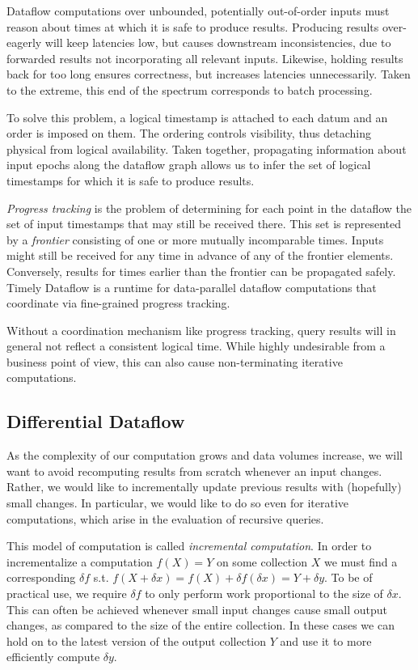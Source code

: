 \documentclass[../index.tex]{subfiles}
\begin{document}
Dataflow computations over unbounded, potentially out-of-order inputs
must reason about times at which it is safe to produce
results. Producing results over-eagerly will keep latencies low, but
causes downstream inconsistencies, due to forwarded results not
incorporating all relevant inputs. Likewise, holding results back for
too long ensures correctness, but increases latencies
unnecessarily. Taken to the extreme, this end of the spectrum
corresponds to batch processing.

To solve this problem, a logical timestamp is attached to each datum
and an order is imposed on them. The ordering controls visibility,
thus detaching physical from logical availability. Taken together,
propagating information about input epochs along the dataflow graph
allows us to infer the set of logical timestamps for which it is safe
to produce results.

\emph{Progress tracking} is the problem of determining for each point
in the dataflow the set of input timestamps that may still be received
there. This set is represented by a \emph{frontier} consisting of one
or more mutually incomparable times. Inputs might still be received
for any time in advance of any of the frontier elements. Conversely,
results for times earlier than the frontier can be propagated
safely. Timely Dataflow is a runtime for data-parallel dataflow
computations that coordinate via fine-grained progress tracking.

Without a coordination mechanism like progress tracking, query results
will in general not reflect a consistent logical time. While highly
undesirable from a business point of view, this can also cause
non-terminating iterative computations.

\subsection{Differential Dataflow} \label{background-differential}

As the complexity of our computation grows and data volumes increase,
we will want to avoid recomputing results from scratch whenever an
input changes. Rather, we would like to incrementally update previous
results with (hopefully) small changes. In particular, we would like
to do so even for iterative computations, which arise in the
evaluation of recursive queries.

This model of computation is called \emph{incremental computation}. In
order to incrementalize a computation $f(X) = Y$ on some collection
$X$ we must find a corresponding $\delta{f}$ s.t. $f(X + \delta{x}) =
f(X) + \delta{f}(\delta{x}) = Y + \delta{y}$. To be of practical use,
we require $\delta{f}$ to only perform work proportional to the size
of $\delta{x}$. This can often be achieved whenever small input
changes cause small output changes, as compared to the size of the
entire collection. In these cases we can hold on to the latest version
of the output collection $Y$ and use it to more efficiently compute
$\delta{y}$.
\end{document}
